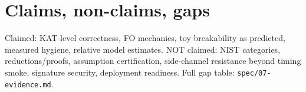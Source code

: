 \documentclass[11pt,a4paper]{article}
\begin{document}
\section{Claims, non-claims, gaps}
Claimed: KAT-level correctness, FO mechanics, toy breakability as
predicted, measured hygiene, relative model estimates. NOT claimed: NIST
categories, reductions/proofs, assumption certification, side-channel
resistance beyond timing smoke, signature security, deployment readiness.
Full gap table: \texttt{spec/07-evidence.md}.
\end{document}
